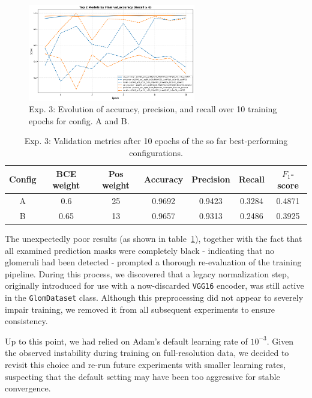 \documentclass[12pt]{article}
\begin{document}
\begin{figure}[t]
    \centering
    \includegraphics[width=0.65\textwidth]{Images/Exp3_acc_prec_rec.png}
    \caption{Exp. 3: Evolution of accuracy, precision, and recall over 10 training epochs for config. A and B.}
    \label{fig:exp3_metrics_plot}
\end{figure}

\begin{table}[t]
    \centering
    \begin{tabular}{c|cc|cccc}
        \toprule
        Config & BCE weight & Pos weight & Accuracy & Precision & Recall & $F_1$-score \\
        \midrule
        A & 0.6 & 25 & 0.9692 & 0.9423 & 0.3284 & 0.4871 \\
        \midrule
        B & 0.65 & 13 & 0.9657 & 0.9313 & 0.2486 & 0.3925 \\
        \bottomrule
    \end{tabular}
    \caption{Exp. 3: Validation metrics after 10 epochs of the so far best-performing configurations.}
    \label{tab:exp3_metrics}
\end{table}

The unexpectedly poor results (as shown in table~\ref{tab:exp3_metrics}), together with the fact that all examined prediction masks were completely black - indicating that no glomeruli had been detected - prompted a thorough re-evaluation of the training pipeline. During this process, we discovered that a legacy normalization step, originally introduced for use with a now-discarded \texttt{VGG16} encoder, was still active in the \texttt{GlomDataset} class. Although this preprocessing did not appear to severely impair training, we removed it from all subsequent experiments to ensure consistency.

Up to this point, we had relied on Adam's default learning rate of $10^{-3}$. Given the observed instability during training on full-resolution data, we decided to revisit this choice and re-run future experiments with smaller learning rates, suspecting that the default setting may have been too aggressive for stable convergence.
\end{document}

